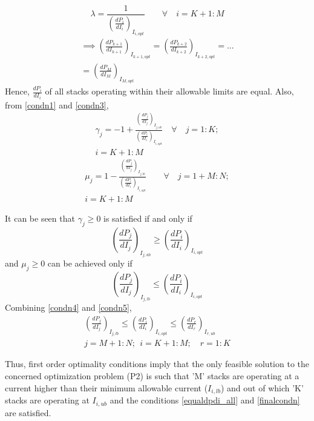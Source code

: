\documentclass[twocolumn]{autart}
\begin{document}
\begin{enumerate}[(a)]
\begin{equation}
\lambda =  \frac{1}{\left( \frac{dP_i}{dI_i} \right)_{I_{i,opt}}} \qquad \forall \quad i = K+1:M 
\end{equation}
\begin{multline}
\implies
\left( \frac{dP_{k+1}}{dI_{k+1}}\right)_{I_{k+1,opt}}=\left( \frac{dP_{k+2}}{dI_{k+2}}\right)_{I_{k+2,opt}}=... \\ =\left( \frac{dP_{M}}{dI_{M}}\right)_{I_{M,opt}}  \label{equaldpdi_all}
\end{multline}
Hence, $\frac{dP_i}{dI_i}$ of all stacks operating within their allowable limits are equal. Also, from  \eqref{condn1} and \eqref{condn3},
\begin{multline}
\gamma_j = -1 + \frac{\left( \frac{dP_j}{dI_j} \right)_{I_{j,ub}}}{\left( \frac{dP_i}{dI_i} \right)_{I_{i,opt}}} \quad \forall \quad j=1:K; \\ i = K+1:M 
\end{multline}
\begin{multline}
\mu_j = 1 - \frac{\left( \frac{dP_j}{dI_j} \right)_{I_{j,lb}}}{\left( \frac{dP_i}{dI_i} \right)_{I_{i,opt}}} \qquad \forall \quad j=1+M:N; \\ i = K+1:M 
\end{multline}

It can be seen that $\gamma_j \geq 0$ is satisfied if and only if
\begin{equation}
\label{condn4}
\left( \frac{dP_j}{dI_j} \right)_{I_{j,ub}} \geq \left( \frac{dP_i}{dI_i} \right)_{I_{i,opt}}
\end{equation}
and $\mu_j \geq 0$ can be achieved only if
\begin{equation}
\label{condn5}
\left( \frac{dP_j}{dI_j} \right)_{I_{j,lb}} \leq \left( \frac{dP_i}{dI_i} \right)_{I_{i,opt}}
\end{equation}
Combining \eqref{condn4} and \eqref{condn5}, 
\begin{gather}
\label{finalcondn}
\left( \frac{dP_j}{dI_j} \right)_{I_{j,lb}} \leq \left( \frac{dP_i}{dI_i} \right)_{I_{i,opt}} \leq \left( \frac{dP_r}{dI_r} \right)_{I_{r,ub}} \\
j = M+1:N; \ \ i = K+1:M; \quad r = 1:K
\end{gather}
\end{enumerate}
Thus, first order optimality conditions imply that the only feasible solution to the concerned optimization problem (P2) is such that 'M' stacks are operating at a current higher than their minimum allowable current ($I_{i,lb}$) and out of which 'K' stacks are operating at $I_{i,ub}$ and the conditions \eqref{equaldpdi_all} and \eqref{finalcondn} are satisfied. 
\end{document}
